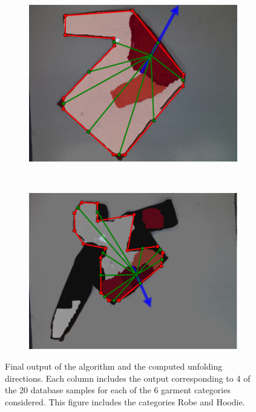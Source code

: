 \begin{figure}[htbp]
\begin{subfigure}[l]{\bigtablewidth}
    	\includegraphics[width=\textwidth]
    	{figures/results/robe19-pnp.pdf}
	\end{subfigure}
	~
    \begin{subfigure}[r]{\bigtablewidth}
	    \centering
    	\includegraphics[width=\textwidth]
    	{figures/results/hoodie16-pnp.pdf}
	\end{subfigure} 
    \caption[Final output of the algorithm and the computed unfolding directions (Robe and Hoodie).]
    {Final output of the algorithm and the computed unfolding directions. Each column includes the output corresponding to 4 of the 20 database samples for each of the 6 garment categories considered. This figure includes the categories Robe and Hoodie.}
    \label{fig:results3}
\end{figure}

